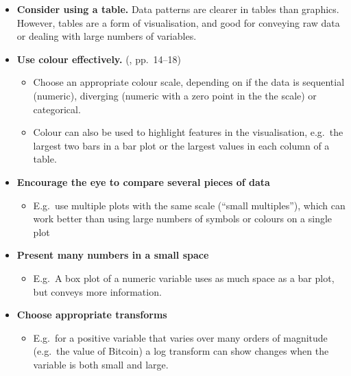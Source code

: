 \documentclass[10pt]{article}
\begin{document}
\begin{multicols}{3}
{\begin{itemize}[itemsep=1ex]
\begin{itemize}
  \item E.g.~In a scatter plot (two numeric variables), the colour and
    shape of each marker can represent two categorical variables, thus
    displaying four variables. Size can represent ordinal variables.
  \item But assess whether the plot is too complex to read.
  \end{itemize}
\item \textbf{Consider using a table.} Data patterns are clearer in
  tables than graphics. However, tables are a form of visualisation,
  and good for conveying raw data or dealing with large numbers of
  variables.
\item \textbf{Use colour effectively.} (\citealp{WexlEtal17big}, pp.~14--18)
  \begin{itemize}
  \item Choose an appropriate colour scale, depending on if the data
    is sequential (numeric), diverging (numeric with a zero point in
    the the scale) or categorical.
  \item Colour can also be used to highlight features in the visualisation,
    e.g.~the largest two bars in a bar plot or the largest values in
    each column of a table.
  \end{itemize}
\item \textbf{Encourage the eye to compare several pieces of data}
  \begin{itemize}
  \item E.g.~use multiple plots with the same scale (``small
    multiples''), which can work better than using large numbers of
    symbols or colours on a single plot
  \end{itemize}
\item \textbf{Present many numbers in a small space}
  \begin{itemize}
  \item E.g.~A box plot of a numeric variable uses as much space as a
    bar plot, but conveys more information.
  \end{itemize}
\item \textbf{Choose appropriate transforms}
  \begin{itemize}
  \item E.g.~for a positive variable that varies over many orders of
    magnitude (e.g.~the value of Bitcoin) a log transform can show
    changes when the variable is both small and large.
  \end{itemize}
\end{itemize}
}


\end{multicols}
\end{document}
